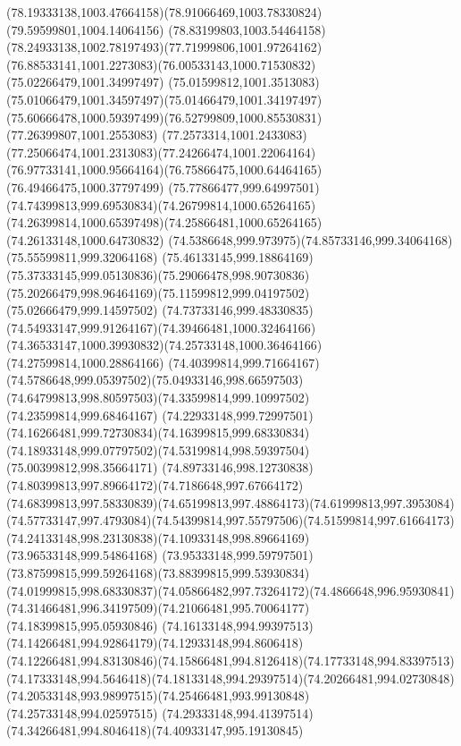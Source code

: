 {{	\curveto(78.19333138,1003.47664158)(78.91066469,1003.78330824)(79.59599801,1004.14064156)
	\curveto(78.83199803,1003.54464158)(78.24933138,1002.78197493)(77.71999806,1001.97264162)
	\curveto(76.88533141,1001.2273083)(76.00533143,1000.71530832)(75.02266479,1001.34997497)
	\curveto(75.01599812,1001.3513083)(75.01066479,1001.34597497)(75.01466479,1001.34197497)
	\curveto(75.60666478,1000.59397499)(76.52799809,1000.85530831)(77.26399807,1001.2553083)
	\curveto(77.2573314,1001.2433083)(77.25066474,1001.2313083)(77.24266474,1001.22064164)
	\curveto(76.97733141,1000.95664164)(76.75866475,1000.64464165)(76.49466475,1000.37797499)
	\curveto(75.77866477,999.64997501)(74.74399813,999.69530834)(74.26799814,1000.65264165)
	\curveto(74.26399814,1000.65397498)(74.25866481,1000.65264165)(74.26133148,1000.64730832)
	\curveto(74.5386648,999.973975)(74.85733146,999.34064168)(75.55599811,999.32064168)
	\curveto(75.46133145,999.18864169)(75.37333145,999.05130836)(75.29066478,998.90730836)
	\curveto(75.20266479,998.96464169)(75.11599812,999.04197502)(75.02666479,999.14597502)
	\curveto(74.73733146,999.48330835)(74.54933147,999.91264167)(74.39466481,1000.32464166)
	\curveto(74.36533147,1000.39930832)(74.25733148,1000.36464166)(74.27599814,1000.28864166)
	\curveto(74.40399814,999.71664167)(74.5786648,999.05397502)(75.04933146,998.66597503)
	\curveto(74.64799813,998.80597503)(74.33599814,999.10997502)(74.23599814,999.68464167)
	\curveto(74.22933148,999.72997501)(74.16266481,999.72730834)(74.16399815,999.68330834)
	\curveto(74.18933148,999.07797502)(74.53199814,998.59397504)(75.00399812,998.35664171)
	\curveto(74.89733146,998.12730838)(74.80399813,997.89664172)(74.7186648,997.67664172)
	\curveto(74.68399813,997.58330839)(74.65199813,997.48864173)(74.61999813,997.3953084)
	\curveto(74.57733147,997.4793084)(74.54399814,997.55797506)(74.51599814,997.61664173)
	\curveto(74.24133148,998.23130838)(74.10933148,998.89664169)(73.96533148,999.54864168)
	\curveto(73.95333148,999.59797501)(73.87599815,999.59264168)(73.88399815,999.53930834)
	\curveto(74.01999815,998.68330837)(74.05866482,997.73264172)(74.4866648,996.95930841)
	\curveto(74.31466481,996.34197509)(74.21066481,995.70064177)(74.18399815,995.05930846)
	\curveto(74.16133148,994.99397513)(74.14266481,994.92864179)(74.12933148,994.8606418)
	\curveto(74.12266481,994.83130846)(74.15866481,994.8126418)(74.17733148,994.83397513)
	\curveto(74.17333148,994.5646418)(74.18133148,994.29397514)(74.20266481,994.02730848)
	\curveto(74.20533148,993.98997515)(74.25466481,993.99130848)(74.25733148,994.02597515)
	\curveto(74.29333148,994.41397514)(74.34266481,994.8046418)(74.40933147,995.19130845)
}}
